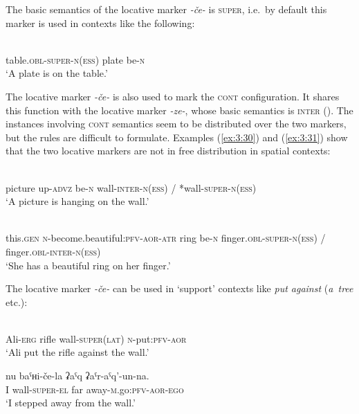﻿\documentclass[output=paper]{langsci/langscibook}
\begin{document}
The basic semantics of the locative marker \emph{-če-} is
\textsc{super}, i.e.\ by default this marker is used in contexts like
the following:

\ea
{}\\
table.\textsc{obl}-\textsc{super}-\textsc{n}(\textsc{ess}) plate be-\textsc{n}\\
\glt `A plate is on the table.'
\z

The locative marker \emph{-če-} is also used to mark the \textsc{cont}
configuration. It shares this function with the locative marker
\emph{-ze-}, whose basic semantics is \textsc{inter} (). The instances involving
\textsc{cont} semantics seem to be distributed over the two markers,
but the rules are difficult to formulate. Examples (\ref{ex:3:30}) and (\ref{ex:3:31}) show
that the two locative markers are not in free distribution in spatial
contexts:

\ea \label{ex:3:30}
\\
picture up-\textsc{advz} be-\textsc{n} wall-\textsc{inter}-\textsc{n}(\textsc{ess}) / *wall-\textsc{super}-\textsc{n}(\textsc{ess})\\
\glt `A picture is hanging on the wall.'

\ex \label{ex:3:31}
\\
this.\textsc{gen} \textsc{n}-become.beautiful:\textsc{pfv}-\textsc{aor}-\textsc{atr} ring be-\textsc{n} finger.\textsc{obl}-\textsc{super}-\textsc{n}(\textsc{ess}) / finger.\textsc{obl}-\textsc{inter}-\textsc{n}(\textsc{ess})\\
\glt 
`She has a beautiful ring on her finger.'
\z

The locative marker \emph{-če-} can be used in `support' contexts like
\emph{put against} (\emph{a~tree} etc.):

\ea \label{ex:3:32}
\\
Ali-\textsc{erg} rifle wall-\textsc{super}(\textsc{lat}) \textsc{n}-put:\textsc{pfv}-\textsc{aor}\\
\glt `Ali put the rifle against the wall.'

\ex
\gll nu baˤʜi-če-la ʡaˤq ʡaˤr-aˤq'-un-na.\\
I wall-\textsc{super}-\textsc{el} far away-\textsc{m}.go:\textsc{pfv}-\textsc{aor}-\textsc{ego}\\
\glt `I stepped away from the wall.'
\z
\end{document}
